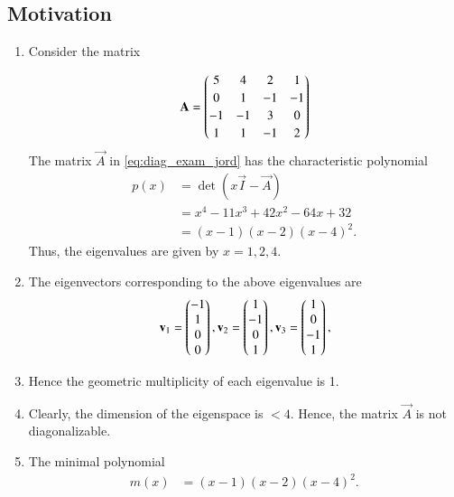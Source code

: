 \subsection{Motivation}
\renewcommand{\theequation}{\theenumi}
\renewcommand{\thefigure}{\theenumi}
\begin{enumerate}[label=\thesection.\arabic*.,ref=\thesection.\theenumi]

\item Consider the matrix

\begin{align}
\mathbf{A} = 
\begin{pmatrix}
  5 &  4 &  2 &  1 \\[2pt]
  0 &  1 & -1 & -1 \\[2pt]
 -1 & -1 &  3 &  0 \\[2pt]
  1 &  1 & -1 &  2
\end{pmatrix}
\label{eq:diag_exam_jord}
\end{align}
%
%
%
The matrix $\vec{A}$ in \eqref{eq:diag_exam_jord} has the characteristic polynomial
\begin{align} 
p(x) & = \det(x \vec{I} - \vec{A}) \\ &  = x^4 - 11 x^3 + 42 x^2 - 64 x + 32  \\ & = (x-1)(x-2)(x-4)^2. \, 
\end{align}
Thus, the eigenvalues are given by $x = 1,2,4$.
\item The eigenvectors corresponding to the above eigenvalues are
\begin{align} 
\mathbf{v}_1 = \begin{pmatrix}-1\\ 1\\ 0\\ 0\end{pmatrix}, 
\mathbf{v}_2 = \begin{pmatrix}1\\ -1\\ 0\\ 1\end{pmatrix}, 
\mathbf{v}_3 = \begin{pmatrix}1\\ 0\\ -1\\ 1\end{pmatrix}, 
\end{align}
\item Hence the geometric multiplicity of each eigenvalue is 1.

\item Clearly, the dimension of the eigenspace is $< 4$.  Hence, the matrix $\vec{A}$ is not diagonalizable.
\item The minimal polynomial 
\begin{align} 
m(x) & = (x-1)(x-2)(x-4)^2. \, 
\end{align}
\end{enumerate}
